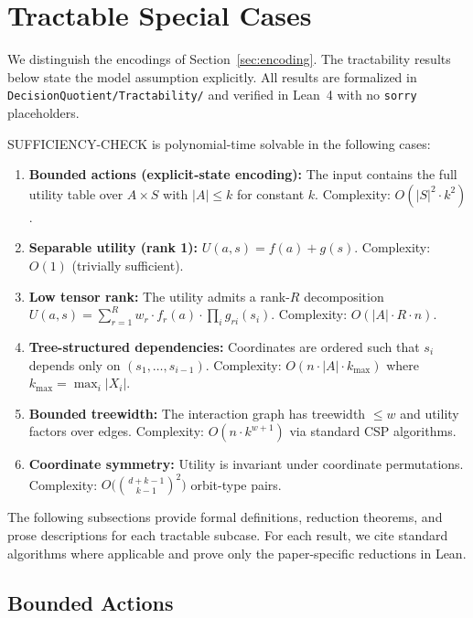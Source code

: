 \section{Tractable Special Cases}\label{sec:tractable}

We distinguish the encodings of Section~\ref{sec:encoding}. The tractability results below state the model assumption explicitly. All results are formalized in \texttt{DecisionQuotient/Tractability/} and verified in Lean~4 with no \texttt{sorry} placeholders.

\begin{theorem}\label{thm:tractable}
SUFFICIENCY-CHECK is polynomial-time solvable in the following cases:
\begin{enumerate}
\item \textbf{Bounded actions (explicit-state encoding):} The input contains the full utility table over $A \times S$ with $|A| \leq k$ for constant $k$. Complexity: $O(|S|^2 \cdot k^2)$.
\item \textbf{Separable utility (rank 1):} $U(a, s) = f(a) + g(s)$. Complexity: $O(1)$ (trivially sufficient).
\item \textbf{Low tensor rank:} The utility admits a rank-$R$ decomposition $U(a,s) = \sum_{r=1}^R w_r \cdot f_r(a) \cdot \prod_i g_{ri}(s_i)$. Complexity: $O(|A| \cdot R \cdot n)$.
\item \textbf{Tree-structured dependencies:} Coordinates are ordered such that $s_i$ depends only on $(s_1, \ldots, s_{i-1})$. Complexity: $O(n \cdot |A| \cdot k_{\max})$ where $k_{\max} = \max_i |X_i|$.
\item \textbf{Bounded treewidth:} The interaction graph has treewidth $\leq w$ and utility factors over edges. Complexity: $O(n \cdot k^{w+1})$ via standard CSP algorithms.
\item \textbf{Coordinate symmetry:} Utility is invariant under coordinate permutations. Complexity: $O\bigl(\binom{d+k-1}{k-1}^2\bigr)$ orbit-type pairs.
\end{enumerate}
\end{theorem}

The following subsections provide formal definitions, reduction theorems, and prose descriptions for each tractable subcase. For each result, we cite standard algorithms where applicable and prove only the paper-specific reductions in Lean.

\subsection{Bounded Actions}\label{sec:tract-bounded}

